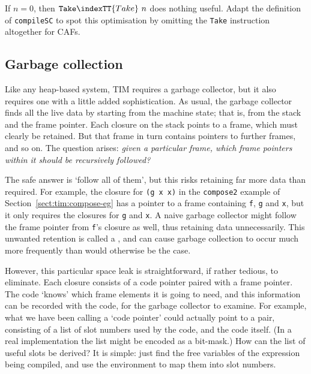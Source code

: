 \begin{exercise} \label{ex:tim:take}
If $n=0$, then $\mbox{\tt Take}\indexTT{Take}~n$ does nothing useful.  Adapt the definition
of \mbox{\tt compileSC} to spot this optimisation by omitting the \mbox{\tt Take} instruction
altogether for CAFs.
\end{exercise}

\subsection{Garbage collection\advanced}
\label{sect:tim:gc1}

Like any heap-based system, TIM requires a garbage collector, but it
also requires one with a little added sophistication.
As usual, the garbage collector finds all the live data by starting from
the machine state; that is, from the stack and the frame pointer.
Each closure on the stack points to a frame, which must clearly be retained.
But that frame in turn contains pointers to further frames, and so on.
The question arises: {\em given a particular frame, which frame
pointers within it should be recursively followed?}

The safe answer is
`follow all of them', but this risks retaining far more data than
required.  For example, the closure for \mbox{\tt (g\ x\ x)} in the \mbox{\tt compose2} example of
Section~\ref{sect:tim:compose-eg} has a pointer to a frame containing
\mbox{\tt f}, \mbox{\tt g} and \mbox{\tt x}, but it only requires the closures for \mbox{\tt g} and \mbox{\tt x}.
A naive garbage collector might follow the frame pointer from \mbox{\tt f}'s closure
as well, thus retaining data unnecessarily.
This unwanted retention is called a ,
and can cause garbage collection to occur much more frequently than would
otherwise be the case.

However, this particular space leak is straightforward, if rather
tedious, to eliminate.  Each closure consists of a code pointer paired with
a frame pointer.  The code `knows' which frame elements it is going to
need, and this information
can be recorded with the code, for the garbage collector
to examine.  For example, what we have been calling a `code pointer' could
actually point to a pair, consisting
of a list of slot numbers used by the code, and
the code itself.  (In a real implementation the list might be encoded as a
bit-mask.)  How can the list of useful slots be derived?  It is simple:
just find the free variables of the expression being compiled, and use the
environment to map them into slot numbers.


